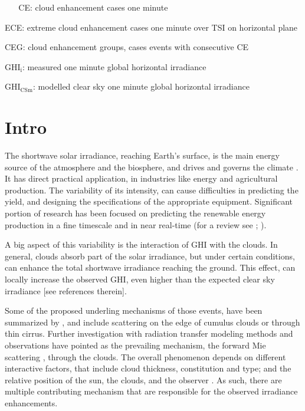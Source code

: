 \documentclass[preprint, 3p,
authoryear]{elsarticle} %
\begin{document}
~ ~ CE: cloud enhancement cases one minute

ECE: extreme cloud enhancement cases one minute over TSI on horizontal
plane

CEG: cloud enhancement groups, cases events with consecutive CE

\(\text{GHI}_\text{i}\): measured one minute global horizontal
irradiance

\(\text{GHI}_\text{CSm}\): modelled clear sky one minute global
horizontal irradiance

\hypertarget{intro}{%
\section{Intro}\label{intro}}

The shortwave solar irradiance, reaching Earth's surface, is the main
energy source of the atmosphere and the biosphere, and drives and
governs the climate \citep{Gray2010}. It has direct practical
application, in industries like energy and agricultural production. The
variability of its intensity, can cause difficulties in predicting the
yield, and designing the specifications of the appropriate equipment.
Significant portion of research has been focused on predicting the
renewable energy production in a fine timescale and in near real-time
(for a review see \citet{Inman2013}; \citet{Graabak2016}).

A big aspect of this variability is the interaction of GHI with the
clouds. In general, clouds absorb part of the solar irradiance, but
under certain conditions, can enhance the total shortwave irradiance
reaching the ground. This effect, can locally increase the observed GHI,
even higher than the expected clear sky irradiance {[}see references
therein{]}.

Some of the proposed underling mechanisms of those events, have been
summarized by \citet{Gueymard2017}, and include scattering on the edge
of cumulus clouds or through thin cirrus. Further investigation with
radiation transfer modeling methods and observations have pointed as the
prevailing mechanism, the forward Mie scattering
\citep{Pecenak2016, Thuillier2013, Yordanov2013, Yordanov2015}, through
the clouds. The overall phenomenon depends on different interactive
factors, that include cloud thickness, constitution and type; and the
relative position of the sun, the clouds, and the observer
\citep{Gueymard2017, Veerman2022}. As such, there are multiple
contributing mechanism that are responsible for the observed irradiance
enhancements.
\end{document}
